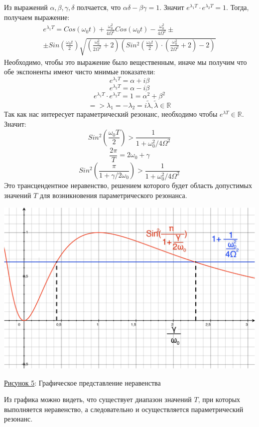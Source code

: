 \documentclass[11pt]{article}    %
\begin{document}
Из выражений $\alpha, \beta, \gamma, \delta$ полчается, что $\alpha \delta - \beta \gamma = 1$.
Значит $e^{\lambda_1 T} \cdot e^{\lambda_2 T} = 1$.
Тогда, получаем выражение:
\begin{multline*}
    e^{\lambda_1 T} = Cos(\omega_0 t) + \frac{\omega_0^2}{4\Omega^2} Cos(\omega_0 t) - \frac{\omega_0^2}{4\Omega^2} \pm
    \\
    \pm Sin(\frac{\omega_0 t}{2}) \sqrt{(\frac{\omega_0^2}{2\Omega^2} + 2)(Sin^2(\frac{\omega_0 t}{2}) \cdot (\frac{\omega_0^2}{2\Omega^2} + 2) - 2)}
\end{multline*}
Необходимо, чтобы это выражение было вещественным, иначе мы получим что обе экспоненты имеют чисто мнимые показатели:
\[
    e^{\lambda_1 T} = \alpha + i\beta
\]
\[
    e^{\lambda_2 T} = \alpha - i\beta
\]
\[
    e^{\lambda_1 T} \cdot e^{\lambda_2 T} = 1 = \alpha^2 + \beta^2
\]
\[
    => \lambda_1 = -\lambda_2 = i\widetilde{\lambda}, \widetilde{\lambda} \in \mathbb{R}
\]
Так как нас интересует параметрический резонанс, необходимо чтобы $e^{\lambda T} \in \mathbb{R}$.
Значит:
\begin{equation}
    Sin^2(\frac{\omega_0 T}{2}) > \frac{1}{1 + \omega_0^2/4\Omega^2}
\end{equation}
\[
    \frac{2\pi}{T} = 2\omega_0 + \gamma
\]
\[
    Sin^2(\frac{\pi}{1+\gamma/2\omega_0}) > \frac{1}{1+\omega_0^2/4\Omega^2}
\]
Это трансцендентное неравенство, решением которого будет область допустимых значений $T$ для возникновения параметрического резонанса.
\par
\begin{center}
\includegraphics[scale = 0.55]{rezonans.jpg}
\par
    \underline{Рисунок 5}: Графическое представление неравенства
\end{center}
\par Из графика можно видеть, что существует диапазон значений $T$, при которых выполняется неравенство, а следовательно и осуществляется параметрический резонанс.
\end{document}
